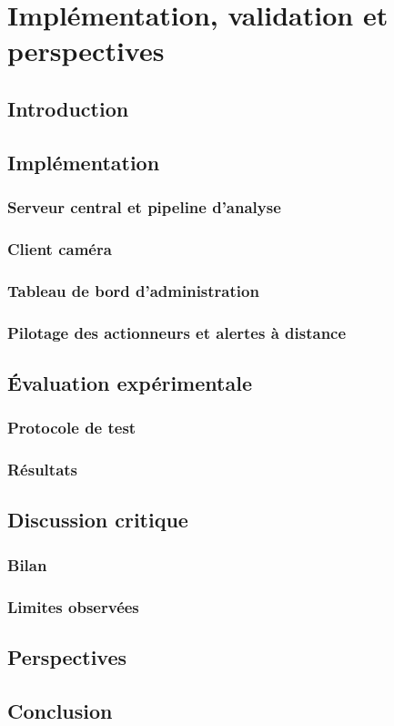 \chapter{Implémentation, validation et perspectives}

\section*{Introduction}
\aredigerr

\section{Implémentation}
\subsection{Serveur central et pipeline d'analyse}\aredigerr
\subsection{Client caméra}\aredigerr
\subsection{Tableau de bord d'administration}\aredigerr
\subsection{Pilotage des actionneurs et alertes à distance}\aredigerr

\section{Évaluation expérimentale}
\subsection{Protocole de test}\aredigerr
\subsection{Résultats}
\aredigerr

\section{Discussion critique}
\subsection{Bilan}\aredigerr
\subsection{Limites observées}\aredigerr

\section{Perspectives}
\aredigerr

\section*{Conclusion}
\aredigerr
